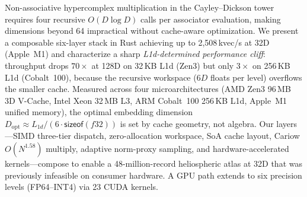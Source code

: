 
Non-associative hypercomplex multiplication in the Cayley--Dickson tower
requires four recursive $O(D \log D)$ calls per associator evaluation,
making dimensions beyond 64 impractical without cache-aware optimization.
We present a composable six-layer stack in Rust achieving up to
2{,}508\,kvec/s at 32D (Apple~M1) and characterize a sharp
\emph{L1d-determined performance cliff}: throughput drops $70\times$ at
128D on 32\,KB L1d (Zen3) but only $3\times$ on 256\,KB L1d
(Cobalt~100), because the recursive workspace ($6D$ floats per level)
overflows the smaller cache.  Measured across four microarchitectures
(AMD Zen3 96\,MB 3D V-Cache, Intel Xeon 32\,MB L3, ARM Cobalt~100
256\,KB L1d, Apple~M1 unified memory), the optimal embedding dimension
$D_\mathrm{opt} \approx L_{1d} / (6 \cdot \mathsf{sizeof}(f32))$
is set by cache geometry, not algebra.  Our layers---SIMD three-tier
dispatch, zero-allocation workspace, SoA cache layout, Cariow
$O(N^{1.58})$ multiply, adaptive norm-proxy sampling, and
hardware-accelerated kernels---compose to enable a 48-million-record
heliospheric atlas at 32D that was previously infeasible on consumer
hardware.  A GPU path extends to six precision levels (FP64--INT4)
via 23 CUDA kernels.

